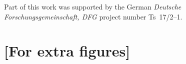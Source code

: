 \documentclass{aa}
\begin{document}
\begin{acknowledgements}
      Part of this work was supported by the German
      \emph{Deut\-sche For\-schungs\-ge\-mein\-schaft, DFG\/} project
      number Ts~17/2--1.
\end{acknowledgements}

%
%


\appendix

\section{[For extra figures]}
\end{document}
